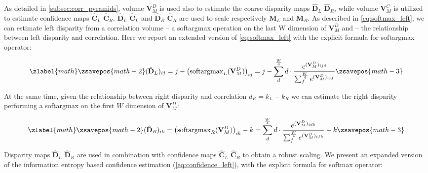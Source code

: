 \documentclass[10pt,twocolumn,letterpaper]{article}
\begin{document}
\label{subsec:diff_mono}

As detailed in \cref{subsec:corr_pyramids}, volume $\mathbf{V}^D_M$ is used also to estimate the coarse disparity maps $\hat{\mathbf{D}}_L$ $\hat{\mathbf{D}}_R$, while volume $\mathbf{V}^C_M$ is utilized to estimate confidence maps $\hat{\mathbf{C}}_L$ $\hat{\mathbf{C}}_R$.
$\hat{\mathbf{D}}_L$ $\hat{\mathbf{C}}_L$ and $\hat{\mathbf{D}}_R$ $\hat{\mathbf{C}}_R$ are used to scale respectively $\mathbf{M}_L$ and $\mathbf{M}_R$.
As described in \cref{eq:softmax_left}, we can estimate left disparity from a correlation volume  -- a softargmax operation on the last W dimension of $\mathbf{V}^D_M$ and  -- the relationship between left disparity and correlation.
Here we report an extended version of \cref{eq:softmax_left} with the explicit formula for softargmax operator:

\small

\begin{equation}
\zlabel{math}
    \zsavepos{math-2}
    (\hat{\mathbf{D}}_L)_{ij} = j - \left(\text{softargmax}_L (\mathbf{V}^D_M )\right)_{ij} = j - \sum_{d}^{\frac{W}{4}} d \cdot \frac{e^{(\mathbf{V}^D_M)_{ijd}}}{\sum_{f}^{\frac{W}{4}} e^{(\mathbf{V}^D_M)_{ijf}}}
    \label{eq:softmax_left2}
    \zsavepos{math-3}\end{equation}

\normalsize

At the same time, given the relationship between right disparity and correlation $d_R=k_L-k_R$ we can estimate the right disparity performing a softargmax on the first $W$ dimension of $\mathbf{V}^D_M$:
\small

\begin{equation}
\zlabel{math}
    \zsavepos{math-2}
    (\hat{\mathbf{D}}_R)_{ik} = \left(\text{softargmax}_R(\mathbf{V}^D_M)\right)_{ik} - k = \sum_{d}^{\frac{W}{4}} d \cdot \frac{e^{(\mathbf{V}^D_M)_{idk}}}{\sum_{f}^{\frac{W}{4}} e^{(\mathbf{V}^D_M)_{ifk}}} - k
    \label{eq:softmax_right}
    \zsavepos{math-3}\end{equation}

\normalsize

Disparity maps $\hat{\mathbf{D}}_L$ $\hat{\mathbf{D}}_R$ are used in combination with confidence maps $\hat{\mathbf{C}}_L$ $\hat{\mathbf{C}}_R$ to obtain a robust scaling.
We present an expanded version of the information entropy based confidence estimation (\cref{eq:confidence_left}), with the explicit formula for softmax operator:
\end{document}
